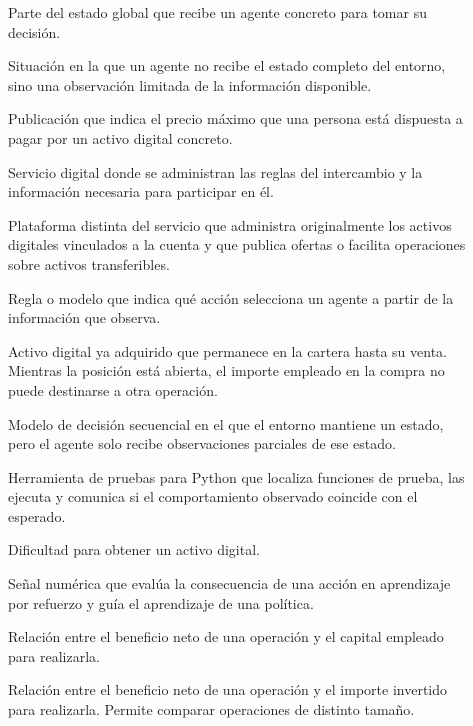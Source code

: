 \begin{description}
  \item[] Parte del estado global que recibe un agente concreto para tomar su decisión.
  \item[] Situación en la que un agente no recibe el estado completo del entorno, sino una observación limitada de la información disponible.
  \item[] Publicación que indica el precio máximo que una persona está dispuesta a pagar por un activo digital concreto.
  \item[] Servicio digital donde se administran las reglas del intercambio y la información necesaria para participar en él.
  \item[] Plataforma distinta del servicio que administra originalmente los activos digitales vinculados a la cuenta y que publica ofertas o facilita operaciones sobre activos transferibles.
  \item[] Regla o modelo que indica qué acción selecciona un agente a partir de la información que observa.
  \item[] Activo digital ya adquirido que permanece en la cartera hasta su venta. Mientras la posición está abierta, el importe empleado en la compra no puede destinarse a otra operación.
  \item[] Modelo de decisión secuencial en el que el entorno mantiene un estado, pero el agente solo recibe observaciones parciales de ese estado.
  \item[] Herramienta de pruebas para Python que localiza funciones de prueba, las ejecuta y comunica si el comportamiento observado coincide con el esperado.
  \item[] Dificultad para obtener un activo digital.
  \item[] Señal numérica que evalúa la consecuencia de una acción en aprendizaje por refuerzo y guía el aprendizaje de una política.
  \item[] Relación entre el beneficio neto de una operación y el capital empleado para realizarla.
  \item[] Relación entre el beneficio neto de una operación y el importe invertido para realizarla. Permite comparar operaciones de distinto tamaño.

\end{description}
